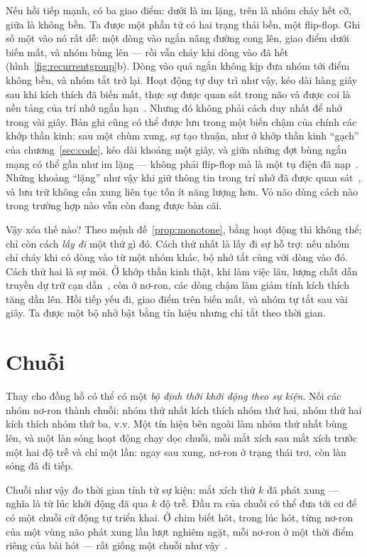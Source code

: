 Nếu hồi tiếp mạnh, có ba giao điểm: dưới là im lặng, trên là nhóm cháy hết cỡ, giữa là không bền. Ta được một phần tử có hai trạng thái bền, một flip-flop. Ghi số một vào nó rất dễ: một dòng vào ngắn nâng đường cong lên, giao điểm dưới biến mất, và nhóm bùng lên --- rồi vẫn cháy khi dòng vào đã hết (hình~\ref{fig:recurrentgroup}b). Dòng vào quá ngắn không kịp đưa nhóm tới điểm không bền, và nhóm tắt trở lại. Hoạt động tự duy trì như vậy, kéo dài hàng giây sau khi kích thích đã biến mất, thực sự được quan sát trong não và được coi là nền tảng của trí nhớ ngắn hạn~\cite{Wang2001}. Nhưng đó không phải cách duy nhất để nhớ trong vài giây. Bản ghi cũng có thể được lưu trong một biến chậm của chính các khớp thần kinh: sau một chùm xung, sự tạo thuận, như ở khớp thần kinh ``gạch'' của chương~\ref{sec:code}, kéo dài khoảng một giây, và giữa những đợt bùng ngắn mạng có thể gần như im lặng --- không phải flip-flop mà là một tụ điện đã nạp~\cite{Mongillo2008}. Những khoảng ``lặng'' như vậy khi giữ thông tin trong trí nhớ đã được quan sát~\cite{Stokes2015}, và lưu trữ không cần xung liên tục tốn ít năng lượng hơn. Vỏ não dùng cách nào trong trường hợp nào vẫn còn đang được bàn cãi.

Vậy xóa thế nào? Theo mệnh đề~\ref{prop:monotone}, bằng hoạt động thì không thể; chỉ còn cách \emph{lấy đi} một thứ gì đó. Cách thứ nhất là lấy đi sự hỗ trợ: nếu nhóm chỉ cháy khi có dòng vào từ một nhóm khác, bộ nhớ tắt cùng với dòng vào đó. Cách thứ hai là sự mỏi. Ở khớp thần kinh thật, khi làm việc lâu, lượng chất dẫn truyền dự trữ cạn dần~\cite{Tsodyks1997}, còn ở nơ-ron, các dòng chậm làm giảm tính kích thích tăng dần lên. Hồi tiếp yếu đi, giao điểm trên biến mất, và nhóm tự tắt sau vài giây. Ta được một bộ nhớ bật bằng tín hiệu nhưng chỉ tắt theo thời gian.

\section{Chuỗi}

Thay cho đồng hồ có thể có một \emph{bộ định thời khởi động theo sự kiện}. Nối các nhóm nơ-ron  thành chuỗi: nhóm thứ nhất kích thích nhóm thứ hai, nhóm thứ hai kích thích nhóm thứ ba, v.v. Một tín hiệu bên ngoài làm nhóm thứ nhất bùng lên, và một làn sóng hoạt động chạy dọc chuỗi, mỗi mắt xích sau mắt xích trước một hai độ trễ và chỉ một lần: ngay sau xung, nơ-ron ở trạng thái trơ, còn làn sóng đã đi tiếp.

Chuỗi như vậy đo thời gian tính từ sự kiện: mắt xích thứ $k$ đã phát xung --- nghĩa là từ lúc khởi động đã qua $k$ độ trễ. Đầu ra của chuỗi có thể đưa tới cơ để có một chuỗi cử động tự triển khai. Ở chim biết hót, trong lúc hót, từng nơ-ron  của một vùng não phát xung lần lượt nghiêm ngặt, mỗi nơ-ron ở một thời điểm riêng của bài hót --- rất giống một chuỗi như vậy~\cite{Hahnloser2002}.

